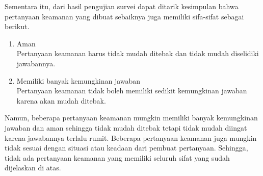 Sementara itu, dari hasil pengujian survei dapat ditarik kesimpulan bahwa pertanyaan keamanan yang dibuat sebaiknya juga memiliki sifa-sifat sebagai berikut.
\begin{enumerate}[itemsep=0mm]
	\item Aman \\
	Pertanyaan keamanan harus tidak mudah ditebak dan tidak mudah diselidiki jawabannya.
	\item Memiliki banyak kemungkinan jawaban \\
	Pertanyaan keamanan tidak boleh memiliki sedikit kemungkinan jawaban karena akan mudah ditebak.
\end{enumerate}

Namun, beberapa pertanyaan keamanan mungkin memiliki banyak kemungkinan jawaban dan aman sehingga tidak mudah ditebak tetapi tidak mudah diingat karena jawabannya terlalu rumit. Beberapa pertanyaan keamanan juga mungkin tidak sesuai dengan situasi atau keadaan dari pembuat pertanyaan. Sehingga, tidak ada pertanyaan keamanan yang memiliki seluruh sifat yang sudah dijelaskan di atas.